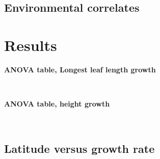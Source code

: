 \documentclass[11pt, oneside]{article}
\begin{document}

\subsection*{Environmental correlates}


\section*{Results}

\begin{table}[htbp]
\fontsize{10}{12}
\selectfont
\textbf{ANOVA table, Longest leaf length growth} \\ \\
\begin{center}
\begin{tabular}{lcccccc}
\toprule



\bottomrule
\end{tabular}
\end{center}
\end{table}

\begin{table}[htbp]
\fontsize{10}{12}
\selectfont
\textbf{ANOVA table, height growth} \\ \\
\begin{center}
\begin{tabular}{lcccccc}
\toprule



\bottomrule
\end{tabular}
\end{center}
\end{table}

\subsection*{Latitude versus growth rate}
\end{document}
